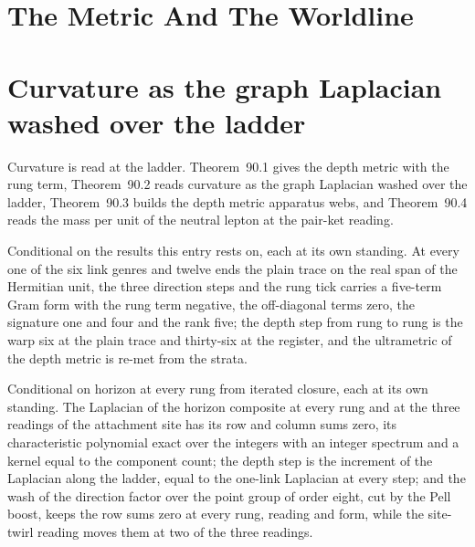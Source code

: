 \section*{The Metric And The Worldline}
\section{Curvature as the graph Laplacian washed over the ladder}\label{mod:X-1-curvature-as-the-graph-laplacian-washed-over-the-ladder}
\label{narr:open:10-1}Curvature is read at the ladder. Theorem~90.1 gives the depth metric with the rung term, Theorem~90.2 reads curvature as the graph Laplacian washed over the ladder, Theorem~90.3 builds the depth metric apparatus webs, and Theorem~90.4 reads the mass per unit of the neutral lepton at the pair-ket reading.
\begin{chconditional}\label{box:X-1-curvature-as-the-graph-laplacian-washed-over-the-ladder:1}
Conditional on the results this entry rests on, each at its own standing. At every one of the six link genres and twelve ends the plain trace on the real span of the Hermitian unit, the three direction steps and the rung tick carries a five-term Gram form with the rung term negative, the off-diagonal terms zero, the signature one and four and the rank five; the depth step from rung to rung is the warp six at the plain trace and thirty-six at the register, and the ultrametric of the depth metric is re-met from the strata.
\end{chconditional}
\begin{chconditional}\label{box:X-1-curvature-as-the-graph-laplacian-washed-over-the-ladder:2}
Conditional on horizon at every rung from iterated closure, each at its own standing. The Laplacian of the horizon composite at every rung and at the three readings of the attachment site has its row and column sums zero, its characteristic polynomial exact over the integers with an integer spectrum and a kernel equal to the component count; the depth step is the increment of the Laplacian along the ladder, equal to the one-link Laplacian at every step; and the wash of the direction factor over the point group of order eight, cut by the Pell boost, keeps the row sums zero at every rung, reading and form, while the site-twirl reading moves them at two of the three readings.
\end{chconditional}
